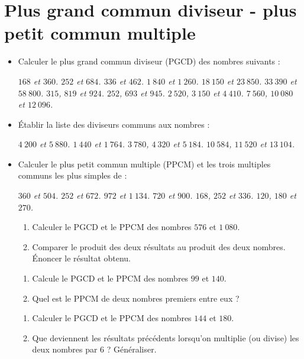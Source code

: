  
 \chapter{Plus grand commun diviseur - plus petit commun multiple} 
 
 \begin{itemize}
 \item Calculer le plus grand commun diviseur (PGCD) des nombres suivants : 
 \begin{itemize}
 \it $168$ et $360$. 
 \it $252$ et $684$. 
 \it $336$ et $462$. 
 \it $1~840$ et $1~260$. 
 \it $18~150$ et $23~850$. 
 \it $33~390$ et $58~800$. 
 \it $315$, $819$ et $924$. 
 \it $252$, $693$ et $945$. 
 \it $2~520$, $3~150$ et $4~410$. 
 \it $7~560$, $10~080$ et $12~096$. 
 \end{itemize}
 \item Établir la liste des diviseurs communs aux nombres : 
 \begin{itemize}
 \it $4~200$ et $5~880$. 
 \it $1~440$ et $1~764$. 
 \it $3~780$, $4~320$ et $5~184$. 
 \it $10~584$, $11~520$ et $13~104$. 
 \end{itemize}
 \item Calculer le plus petit commun multiple (PPCM) et
 les trois multiples communs les plus simples de : 
 \begin{itemize}
 \it $360$ et $504$. 
 \it $252$ et $672$. 
 \it $972$ et $1~134$. 
 \it $720$ et $900$. 
 \it $168$, $252$ et $336$. 
 \it $120$, $180$ et $270$. 
 \end{itemize}
 \it \begin{enumerate}
 \item Calculer le PGCD et le PPCM des nombres $576$ et $1~080$. 
 \item Comparer le produit des deux résultats au produit des deux nombres. Énoncer le résultat obtenu.
 \end{enumerate}
 \it \begin{enumerate}
 \item Calcule le PGCD et le PPCM des nombres $99$ et $140$. 
 \item Quel est le PPCM de deux nombres premiers entre eux ? 
 \end{enumerate}
 \it \begin{enumerate}
 \item Calculer le PGCD et le PPCM des nombres $144$ et 
 $180$. 
 \item Que deviennent les résultats précédents lorsqu'on
 multiplie (ou divise) les deux nombres par $6$ ?
 Généraliser. 

\end{enumerate}
\end{itemize}
